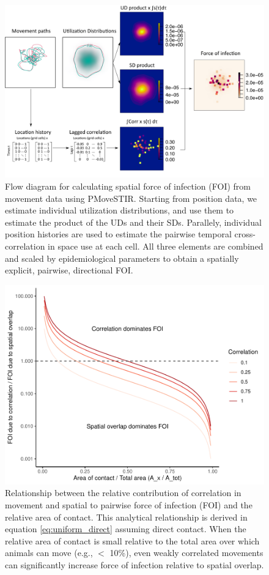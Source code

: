 \documentclass[letterpaper]{article}
\begin{document}
 \begin{figure}
     \includegraphics[width=\textwidth]{figures/steps_diagram.png}
     \caption{Flow diagram for calculating spatial force of infection (FOI) from movement data using PMoveSTIR. Starting from position data, we estimate individual utilization distributions, and use them to estimate the product of the UDs and their SDs. Parallely, individual position histories are used to estimate the pairwise temporal cross-correlation in space use at each cell. All three elements are combined and scaled by epidemiological parameters to obtain a spatially explicit, pairwise, directional FOI. }
 	\label{fig:steps}
 \end{figure}

\begin{figure}
    \includegraphics[width=\textwidth]{figures/correlation_analytical_figure.pdf}
    \caption{Relationship between the relative contribution of correlation in movement and spatial to pairwise force of infection (FOI) and the relative area of contact. This analytical relationship is derived in equation \ref{eq:uniform_direct} assuming direct contact.  When the relative area of contact is small relative to the total area over which animals can move (e.g., $<$ 10\%), even weakly correlated movements can significantly increase force of infection relative to spatial overlap.}
    \label{fig:analytical_corr}
\end{figure}
\end{document}
